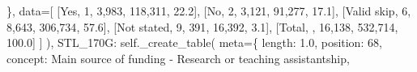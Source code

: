 \documentclass[
  11pt,
  a4paper,
]{article}
\newenvironment{Shaded}{\begin{snugshade}}{\end{snugshade}}
\newcommand{\NormalTok}[1]{\textcolor[rgb]{0.00,0.23,0.31}{#1}}
\newcommand{\OperatorTok}[1]{\textcolor[rgb]{0.37,0.37,0.37}{#1}}
\newcommand{\StringTok}[1]{\textcolor[rgb]{0.13,0.47,0.30}{#1}}
\newcommand{\VariableTok}[1]{\textcolor[rgb]{0.07,0.07,0.07}{#1}}
\begin{document}
\begin{Shaded}
\begin{Highlighting}[]
\NormalTok{                \},}
\NormalTok{                data}\OperatorTok{=}\NormalTok{[}
\NormalTok{                    [}\StringTok{\textquotesingle{}Yes\textquotesingle{}}\NormalTok{, }\StringTok{\textquotesingle{}1\textquotesingle{}}\NormalTok{, }\StringTok{\textquotesingle{}3,983\textquotesingle{}}\NormalTok{, }\StringTok{\textquotesingle{}118,311\textquotesingle{}}\NormalTok{, }\StringTok{\textquotesingle{}22.2\textquotesingle{}}\NormalTok{],}
\NormalTok{                    [}\StringTok{\textquotesingle{}No\textquotesingle{}}\NormalTok{, }\StringTok{\textquotesingle{}2\textquotesingle{}}\NormalTok{, }\StringTok{\textquotesingle{}3,121\textquotesingle{}}\NormalTok{, }\StringTok{\textquotesingle{}91,277\textquotesingle{}}\NormalTok{, }\StringTok{\textquotesingle{}17.1\textquotesingle{}}\NormalTok{],}
\NormalTok{                    [}\StringTok{\textquotesingle{}Valid skip\textquotesingle{}}\NormalTok{, }\StringTok{\textquotesingle{}6\textquotesingle{}}\NormalTok{, }\StringTok{\textquotesingle{}8,643\textquotesingle{}}\NormalTok{, }\StringTok{\textquotesingle{}306,734\textquotesingle{}}\NormalTok{, }\StringTok{\textquotesingle{}57.6\textquotesingle{}}\NormalTok{],}
\NormalTok{                    [}\StringTok{\textquotesingle{}Not stated\textquotesingle{}}\NormalTok{, }\StringTok{\textquotesingle{}9\textquotesingle{}}\NormalTok{, }\StringTok{\textquotesingle{}391\textquotesingle{}}\NormalTok{, }\StringTok{\textquotesingle{}16,392\textquotesingle{}}\NormalTok{, }\StringTok{\textquotesingle{}3.1\textquotesingle{}}\NormalTok{],}
\NormalTok{                    [}\StringTok{\textquotesingle{}Total\textquotesingle{}}\NormalTok{, }\StringTok{\textquotesingle{}\textquotesingle{}}\NormalTok{, }\StringTok{\textquotesingle{}16,138\textquotesingle{}}\NormalTok{, }\StringTok{\textquotesingle{}532,714\textquotesingle{}}\NormalTok{, }\StringTok{\textquotesingle{}100.0\textquotesingle{}}\NormalTok{]}
\NormalTok{                ]}
\NormalTok{            ),}
            \StringTok{\textquotesingle{}STL\_170G\textquotesingle{}}\NormalTok{: }\VariableTok{self}\NormalTok{.\_create\_table(}
\NormalTok{                meta}\OperatorTok{=}\NormalTok{\{}
                    \StringTok{\textquotesingle{}length\textquotesingle{}}\NormalTok{: }\StringTok{\textquotesingle{}1.0\textquotesingle{}}\NormalTok{, }\StringTok{\textquotesingle{}position\textquotesingle{}}\NormalTok{: }\StringTok{\textquotesingle{}68\textquotesingle{}}\NormalTok{,}
                    \StringTok{\textquotesingle{}concept\textquotesingle{}}\NormalTok{: }\StringTok{\textquotesingle{}Main source of funding {-} Research or teaching assistantship\textquotesingle{}}\NormalTok{,}

\end{Highlighting}
\end{Shaded}
\end{document}
